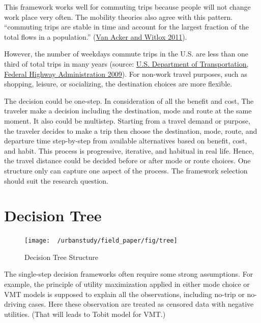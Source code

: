 \documentclass[
  11pt,
  openany]{memoir}
\begin{document}
This framework works well for commuting trips because people will not change work place very often. The mobility theories also agree with this pattern.
``commuting trips are stable in time and account for the largest fraction of the total flows in a population.'' (\protect\hyperlink{ref-vanackerCommutingTripsTours2011}{Van Acker and Witlox 2011}).

However, the number of weekdays commute trips in the U.S. are less than one third of total trips in many years (source: \protect\hyperlink{ref-nhts_2009}{U.S. Department of Transportation, Federal Highway Administration 2009}).
For non-work travel purposes, such as shopping, leisure, or socializing, the destination choices are more flexible.

The decision could be one-step. In consideration of all the benefit and cost, The traveler make a decision including the destination, mode and route at the same moment.
It also could be multistep. Starting from a travel demand or purpose, the traveler decides to make a trip then choose the destination, mode, route, and departure time step-by-step from available alternatives based on benefit, cost, and habit.
This process is progressive, iterative, and habitual in real life. Hence, the travel distance could be decided before or after mode or route choices. One structure only can capture one aspect of the process.
The framework selection should suit the research question.

\hypertarget{decision-tree}{%
\section{Decision Tree}\label{decision-tree}}

\begin{figure}

{\centering \texttt{[image: ~/urbanstudy/field\_paper/fig/tree]} 

}

\caption{Decision Tree Structure}\label{fig:Tree}
\end{figure}

The single-step decision frameworks often require some strong assumptions. For example, the principle of utility maximization applied in either mode choice or VMT models is supposed to explain all the observations, including no-trip or no-driving cases.
Here these observation are treated as censored data with negative utilities. (That will leads to Tobit model for VMT.)
\end{document}
